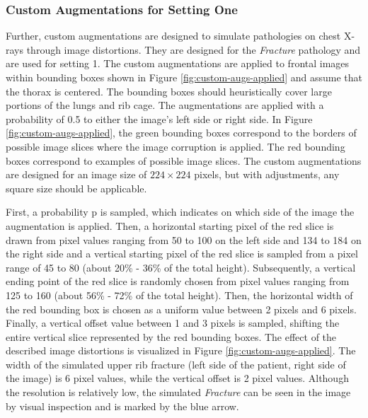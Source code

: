\subsubsection{Custom Augmentations for Setting One}
\label{section: custom augmentations}
Further, custom augmentations are designed to simulate pathologies on chest X-rays through image distortions.
They are designed for the \textit{Fracture} pathology and are used for setting 1.
The custom augmentations are applied to frontal images within bounding boxes shown in Figure \ref{fig:custom-augs-applied} and assume that the thorax is centered.
The bounding boxes should heuristically cover large portions of the lungs and rib cage.
The augmentations are applied with a probability of 0.5 to either the image's left side or right side.
In Figure \ref{fig:custom-augs-applied}, the green bounding boxes correspond to the borders of possible image slices where the image corruption is applied.
The red bounding boxes correspond to examples of possible image slices.
The custom augmentations are designed for an image size of $224\times224$ pixels, but with adjustments, any square size should be applicable.
\par
First, a probability p is sampled, which indicates on which side of the image the augmentation is applied.
Then, a horizontal starting pixel of the red slice is drawn from pixel values ranging from 50 to 100 on the left side and 134 to 184 on the right side and a vertical starting pixel of the red slice is sampled from a pixel range of 45 to 80 (about 20\% - 36\% of the total height).
Subsequently, a vertical ending point of the red slice is randomly chosen from pixel values ranging from 125 to 160 (about 56\% - 72\% of the total height).
Then, the horizontal width of the red bounding box is chosen as a uniform value between 2 pixels and 6 pixels.
Finally, a vertical offset value between 1 and 3 pixels is sampled, shifting the entire vertical slice represented by the red bounding boxes.
The effect of the described image distortions is visualized in Figure \ref{fig:custom-augs-applied}.
The width of the simulated upper rib fracture (left side of the patient, right side of the image) is 6 pixel values, while the vertical offset is 2 pixel values.
Although the resolution is relatively low, the simulated \textit{Fracture} can be seen in the image by visual inspection and is marked by the blue arrow.
